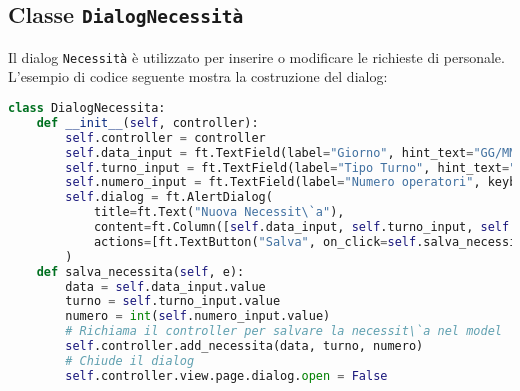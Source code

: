 \documentclass[a4paper,12pt]{report}
\begin{document}
\subsection{Classe \texttt{DialogNecessit\`a}}
Il dialog \texttt{Necessit\`a} \`e utilizzato per inserire o modificare le richieste di personale. L'esempio di codice seguente mostra la costruzione del dialog:
\begin{lstlisting}[language=Python]
class DialogNecessita:
    def __init__(self, controller):
        self.controller = controller
        self.data_input = ft.TextField(label="Giorno", hint_text="GG/MM/YYYY")
        self.turno_input = ft.TextField(label="Tipo Turno", hint_text="mattina/pomeriggio/notte")
        self.numero_input = ft.TextField(label="Numero operatori", keyboard_type=ft.KeyboardType.NUMBER)
        self.dialog = ft.AlertDialog(
            title=ft.Text("Nuova Necessit\`a"),
            content=ft.Column([self.data_input, self.turno_input, self.numero_input]),
            actions=[ft.TextButton("Salva", on_click=self.salva_necessita)]
        )
    def salva_necessita(self, e):
        data = self.data_input.value
        turno = self.turno_input.value
        numero = int(self.numero_input.value)
        # Richiama il controller per salvare la necessit\`a nel model
        self.controller.add_necessita(data, turno, numero)
        # Chiude il dialog
        self.controller.view.page.dialog.open = False
\end{lstlisting}
\end{document}
